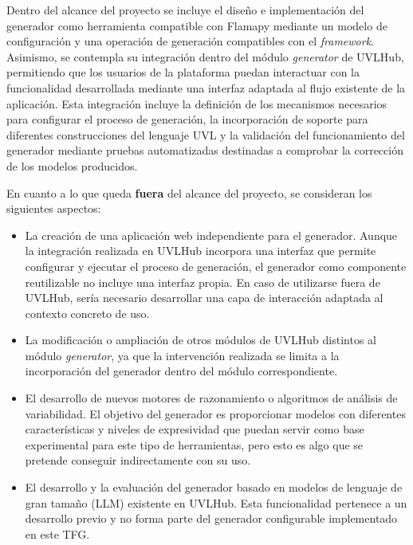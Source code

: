 Dentro del alcance del proyecto se incluye el diseño e implementación del generador como herramienta compatible con Flamapy mediante un modelo de configuración y una operación de generación compatibles con el \textit{framework}. Asimismo, se contempla su integración dentro del módulo \textit{generator} de UVLHub, permitiendo que los usuarios de la plataforma puedan interactuar con la funcionalidad desarrollada mediante una interfaz adaptada al flujo existente de la aplicación. Esta integración incluye la definición de los mecanismos necesarios para configurar el proceso de generación, la incorporación de soporte para diferentes construcciones del lenguaje UVL y la validación del funcionamiento del generador mediante pruebas automatizadas destinadas a comprobar la corrección de los modelos producidos.

En cuanto a lo que queda \textbf{fuera} del alcance del proyecto, se consideran los siguientes aspectos:

\begin{itemize}
    \item La creación de una aplicación web independiente para el generador. Aunque la integración realizada en UVLHub incorpora una interfaz que permite configurar y ejecutar el proceso de generación, el generador como componente reutilizable no incluye una interfaz propia. En caso de utilizarse fuera de UVLHub, sería necesario desarrollar una capa de interacción adaptada al contexto concreto de uso.
    
    \item La modificación o ampliación de otros módulos de UVLHub distintos al módulo \textit{generator}, ya que la intervención realizada se limita a la incorporación del generador dentro del módulo correspondiente.
    
    \item El desarrollo de nuevos motores de razonamiento o algoritmos de análisis de variabilidad. El objetivo del generador es proporcionar modelos con diferentes características y niveles de expresividad que puedan servir como base experimental para este tipo de herramientas, pero esto es algo que se pretende conseguir indirectamente con su uso.

    \item El desarrollo y la evaluación del generador basado en modelos de
    lenguaje de gran tamaño (LLM) existente en UVLHub. Esta funcionalidad
    pertenece a un desarrollo previo y no forma parte del generador
    configurable implementado en este TFG.
\end{itemize}

